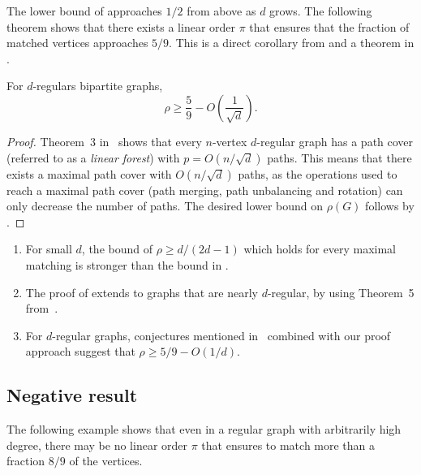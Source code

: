 The lower bound of  approaches
%
%
$1/2$ from above as $d$ grows.  
The following theorem shows that there exists %
%
%
%
%
a   %
linear order $\pi$ that ensures that the fraction of matched vertices approaches $5/9$.
This is a direct corollary from  and a theorem in \cite{FeigeRS14}.

%
\begin{corollary}
	\label{cor:regular}
	For $d$-regulars bipartite graphs, 
$$\rho \ge \frac{5}{9} - O\left(\frac{1}{\sqrt{d}}\right).$$	
\end{corollary}

\begin{proof}
  Theorem~3 in~\cite{FeigeRS14} shows that every $n$-vertex $d$-regular graph has a path cover (referred to as a \emph{linear forest}) with  $p = O(n/\sqrt{d})$ paths. This means that there exists a maximal path cover with $O(n/\sqrt{d})$ paths, as the operations used to reach a maximal path cover (path merging, path unbalancing and rotation) can only decrease the number of paths.
%
%
The desired lower bound on $\rho(G)$ follows by . %
%
%
%
\end{proof}

\begin{remark}
\begin{enumerate}
	
	\item For small $d$, the bound of $\rho \ge d/(2d - 1)$ which holds for every maximal matching is stronger than the bound in .
	
	\item The proof of  extends to graphs that are nearly $d$-regular, by using Theorem~5 from~\cite{FeigeRS14}.
	
	\item For $d$-regular graphs, conjectures mentioned in~\cite{FeigeRS14} combined with our proof approach suggest that $\rho \ge 5/9 - O(1/d)$.
	
\end{enumerate}
\end{remark}

\subsection{Negative result}
\label{sec:regular-neg}

The following example shows that even in a regular graph with arbitrarily high degree, there may be no linear order $\pi$ that ensures to match more than a fraction $8/9$ of the vertices.

